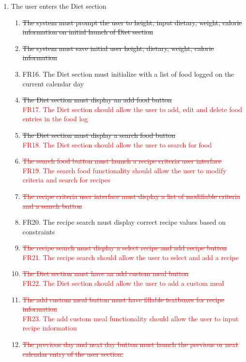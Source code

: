 \documentclass[12pt,letterpaper]{article}
\begin{document}
\begin{enumerate}[{BE}1.]
	\item The user enters the Diet section
	\begin{enumerate}[resume*]
\item {\color{red}\sout{The system must prompt the user to height, input dietary, weight, calorie information on initial launch of Diet section}}
\item {\color{red}\sout{The system must save initial user height, dietary, weight, calorie information}}
		\item FR16. The Diet section must initialize with a list of food logged on the current calendar day
\item {\color{red}\sout{The Diet section must display an add food button}}\\
\textcolor{red}{FR17. The Diet section should allow the user to add, edit and delete food entries in the food log}
\item {\color{red}\sout{The Diet section must display a search food button}}\\
\textcolor{red}{FR18. The Diet section should allow the user to search for food}
\item \textcolor{red}{\sout{The search food button must launch a recipe criteria user interface}}\\
\textcolor{red}{FR19. The search food functionality should allow the user to modify criteria and search for recipes}
\item \textcolor{red}{\sout{The recipe criteria user interface must display a list of modifiable criteria and a search button}}
\item FR20. The recipe search must display correct recipe values based on constraints
\item \textcolor{red}{\sout{The recipe search must display a select recipe and add recipe button}}\\
\textcolor{red}{FR21. The recipe search should allow the user to select and add a recipe}
\item \textcolor{red}{\sout{The Diet section must have an add custom meal button}}\\
\textcolor{red}{FR22. The Diet section should allow the user to add a custom meal}
\item \textcolor{red}{\sout{The add custom meal button must have fillable textboxes for recipe information}}\\
\textcolor{red}{FR23. The add custom meal functionality should allow the user to input recipe information}
\item \textcolor{red}{\sout{The previous day and next day button must launch the previous or next calendar entry of the user section.}}
	\end{enumerate}
	

\end{enumerate}
\end{document}
